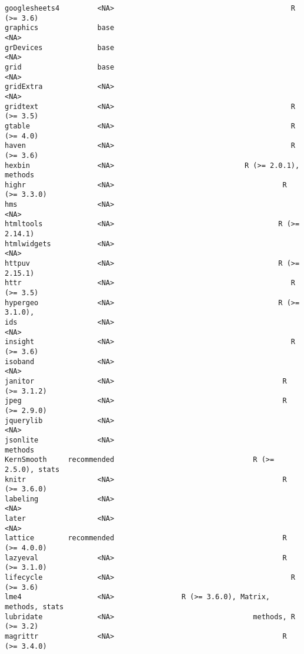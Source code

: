 \documentclass[
  letterpaper,
  DIV=11,
  numbers=noendperiod]{scrreprt}
\begin{document}
\begin{verbatim}
googlesheets4         <NA>                                          R (>= 3.6)
graphics              base                                                <NA>
grDevices             base                                                <NA>
grid                  base                                                <NA>
gridExtra             <NA>                                                <NA>
gridtext              <NA>                                          R (>= 3.5)
gtable                <NA>                                          R (>= 4.0)
haven                 <NA>                                          R (>= 3.6)
hexbin                <NA>                               R (>= 2.0.1), methods
highr                 <NA>                                        R (>= 3.3.0)
hms                   <NA>                                                <NA>
htmltools             <NA>                                       R (>= 2.14.1)
htmlwidgets           <NA>                                                <NA>
httpuv                <NA>                                       R (>= 2.15.1)
httr                  <NA>                                          R (>= 3.5)
hypergeo              <NA>                                       R (>= 3.1.0),
ids                   <NA>                                                <NA>
insight               <NA>                                          R (>= 3.6)
isoband               <NA>                                                <NA>
janitor               <NA>                                        R (>= 3.1.2)
jpeg                  <NA>                                        R (>= 2.9.0)
jquerylib             <NA>                                                <NA>
jsonlite              <NA>                                             methods
KernSmooth     recommended                                 R (>= 2.5.0), stats
knitr                 <NA>                                        R (>= 3.6.0)
labeling              <NA>                                                <NA>
later                 <NA>                                                <NA>
lattice        recommended                                        R (>= 4.0.0)
lazyeval              <NA>                                        R (>= 3.1.0)
lifecycle             <NA>                                          R (>= 3.6)
lme4                  <NA>                R (>= 3.6.0), Matrix, methods, stats
lubridate             <NA>                                 methods, R (>= 3.2)
magrittr              <NA>                                        R (>= 3.4.0)

\end{verbatim}
\end{document}
